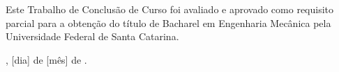 \begin{folhadeaprovacao}
      \begin{center}
            {\ABNTEXchapterfont\large\imprimirautor}

            \vspace*{\fill}
            {\ABNTEXchapterfont\bfseries\Large\imprimirtitulo}
            \vspace*{\fill}
      \end{center}

      \hspace{.45\textwidth}
      \begin{minipage}{.5\textwidth}
            Este Trabalho de Conclusão de Curso foi avaliado e aprovado como requisito
            parcial para a obtenção do título de Bacharel em Engenharia Mecânica pela
            Universidade Federal de Santa Catarina.
      \end{minipage}

      \vspace{\onelineskip}
      \begin{center}
            \imprimirlocal, [dia] de [mês] de \imprimirdata.
      \end{center}

      \vspace*{\fill}
      \vspace*{\fill}
\end{folhadeaprovacao}

